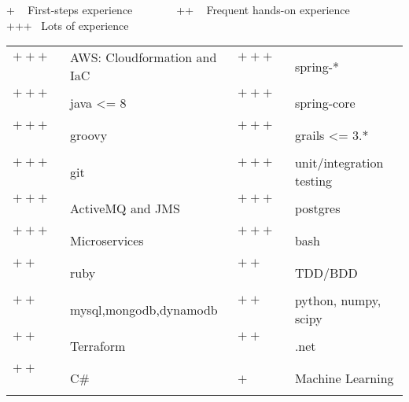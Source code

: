 
\newcommand{\plus}{$+~$~~~~}
\newcommand{\pplus}{$++~$~~~~}
\newcommand{\ppplus}{$+++$~~~~~}
\begin{cventries}
\cventry
{+ ~ First-steps experience ~~~  ~~~ ++ ~ Frequent hands-on experience ~~~  ~~~ +++ ~Lots of experience \vspace{0.1em}} %
{} %
{} %
{} %
{ %
\hspace{1em}
\setlength{\tabcolsep}{3pt}
\begin{tabular}{  l l @{\hskip 1in} l l }
		   \ppplus & AWS: Cloudformation and IaC &  \ppplus &  spring-* \\                      
           \ppplus & java <= 8 & \ppplus & spring-core \\ 
           \ppplus & groovy & \ppplus & grails <= 3.* \\
           \ppplus & git & \ppplus & unit/integration testing  \\
		   \ppplus & ActiveMQ and JMS & \ppplus & postgres\\
           \ppplus & Microservices  & \ppplus & bash\vspace{0.7em}\\ 
           \pplus & ruby &\pplus & TDD/BDD\\ 
           \pplus & mysql,mongodb,dynamodb & \pplus & python, numpy, scipy \\ 
           \pplus & Terraform  & \pplus & .net  \\
           \pplus & C\# & \plus & Machine Learning
\end{tabular}
}


\end{cventries}